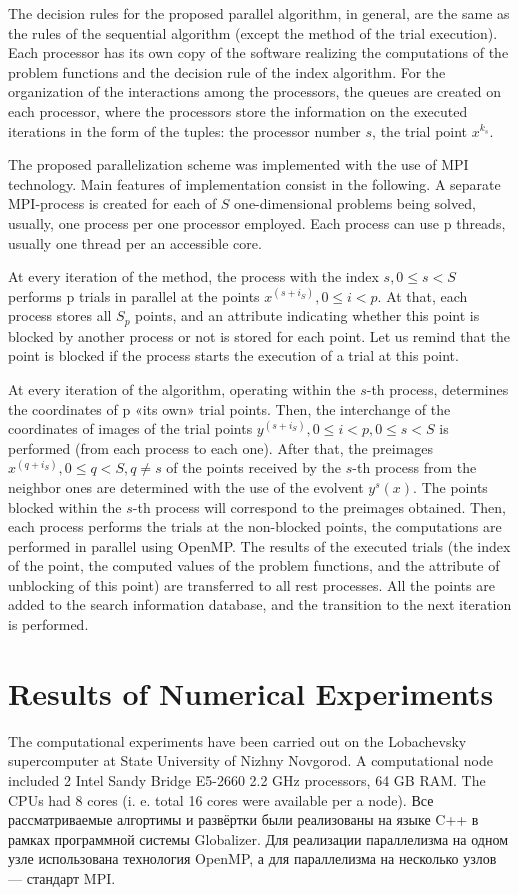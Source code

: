 \documentclass[runningheads]{llncs}
\begin{document}
The decision rules for the proposed parallel algorithm, in general, are the same as the rules of the sequential algorithm (except the method of the trial execution). Each processor has its own copy of the software realizing the computations of the problem functions and the decision rule of the index algorithm. For the organization of the interactions among the processors, the queues are created on each processor, where the processors store the information on the executed iterations in the form of the tuples: the processor number \(s\), the trial point \(x{}^{k_s}\).
\par
The proposed parallelization scheme was implemented with the use of MPI technology. Main features of implementation consist in the following. A separate MPI-process is created for each of \(S\) one-dimensional problems being solved, usually, one process per one processor employed. Each process can use p threads, usually one thread per an accessible core.
\par
At every iteration of the method, the process with the index \(s,0\leqslant s< S\) performs p trials in parallel at the points \(x^{(s+i_S)},0\leqslant i<p\). At that, each process stores all \(S_p\) points, and an attribute indicating whether this point is blocked by another process or not is stored for each point. Let us remind that the point is blocked if the process starts the execution of a trial at this point.
\par
At every iteration of the algorithm, operating within the \(s\)-th process, determines the coordinates of p «its own» trial points. Then, the interchange of the coordinates of images of the trial points \(y^{(s+i_S)},0\leqslant i<p, 0\leqslant s< S\) is performed (from each process to each one). After that, the preimages \(x^{(q+i_S)},0\leqslant q<S,q\not=s\) of the points received by the \(s\)-th process from the neighbor ones are determined with the use of the evolvent \(y^s (x)\). The points blocked within the \(s\)-th process will correspond to the preimages obtained. Then, each process performs the trials at the non-blocked points, the computations are performed in parallel using OpenMP. The results of the executed trials (the index of the point, the computed values of the problem functions, and the attribute of unblocking of this point) are transferred to all rest processes. All the points are added to the search information database, and the transition to the next iteration is performed.
\par

\section{Results of Numerical Experiments}
The computational experiments have been carried out on the Lobachevsky supercomputer at
State University of Nizhny Novgorod. A computational node included 2 Intel
Sandy Bridge E5-2660 2.2 GHz processors, 64 GB RAM. The CPUs had 8 cores (i. e. total 16 cores
were available per a node). Все рассматриваемые алгортимы и развёртки были реализованы на языке C++ в рамках программной системы Globalizer.
Для реализации параллелизма на одном узле использована технология OpenMP, а для параллелизма на несколько узлов --- стандарт MPI.
\end{document}
